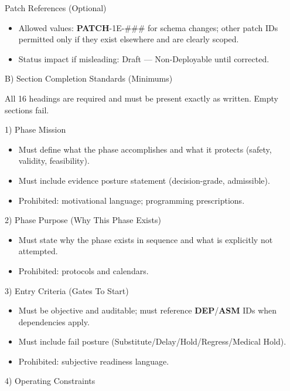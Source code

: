 \documentclass[10pt]{article}
\begin{document}
Patch References (Optional)

\begin{itemize}
\item Allowed values: \textbf{PATCH}-1E-\#\#\# for schema changes; other patch IDs permitted only if they exist elsewhere and are clearly scoped.
\item Status impact if misleading: Draft — Non-Deployable until corrected.
\end{itemize}

B) Section Completion Standards (Minimums)

All 16 headings are required and must be present exactly as written. Empty sections fail.

1) Phase Mission

\begin{itemize}
\item Must define what the phase accomplishes and what it protects (safety, validity, feasibility).
\item Must include evidence posture statement (decision-grade, admissible).
\item Prohibited: motivational language; programming prescriptions.
\end{itemize}

2) Phase Purpose (Why This Phase Exists)

\begin{itemize}
\item Must state why the phase exists in sequence and what is explicitly not attempted.
\item Prohibited: protocols and calendars.
\end{itemize}

3) Entry Criteria (Gates To Start)

\begin{itemize}
\item Must be objective and auditable; must reference \textbf{DEP}/\textbf{ASM} IDs when dependencies apply.
\item Must include fail posture (Substitute/Delay/Hold/Regress/Medical Hold).
\item Prohibited: subjective readiness language.
\end{itemize}

4) Operating Constraints
\end{document}
